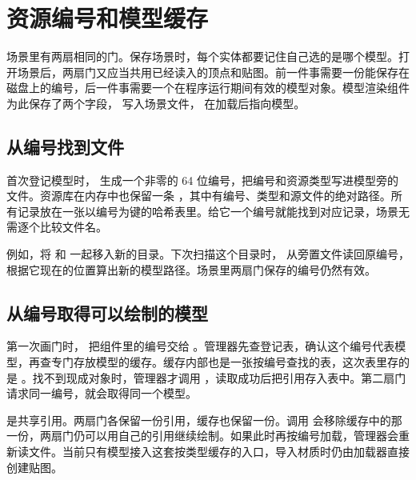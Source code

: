 \clearpage
\section{资源编号和模型缓存}\label{sec:data-assets}
场景里有两扇相同的门。保存场景时，每个实体都要记住自己选的是哪个模型。打开场景后，两扇门又应当共用已经读入的顶点和贴图。前一件事需要一份能保存在磁盘上的编号，后一件事需要一个在程序运行期间有效的模型对象。模型渲染组件  为此保存了两个字段， 写入场景文件， 在加载后指向模型。

\subsection{从编号找到文件}
首次登记模型时， 生成一个非零的 64 位编号，把编号和资源类型写进模型旁的  文件。资源库在内存中也保留一条 ，其中有编号、类型和源文件的绝对路径。所有记录放在一张以编号为键的哈希表里。给它一个编号就能找到对应记录，场景无需逐个比较文件名。

例如，将  和  一起移入新的目录。下次扫描这个目录时， 从旁置文件读回原编号，根据它现在的位置算出新的模型路径。场景里两扇门保存的编号仍然有效。

\subsection{从编号取得可以绘制的模型}
第一次画门时， 把组件里的编号交给 。管理器先查登记表，确认这个编号代表模型，再查专门存放模型的缓存。缓存内部也是一张按编号查找的表，这次表里存的是 。找不到现成对象时，管理器才调用 ，读取成功后把引用存入表中。第二扇门请求同一编号，就会取得同一个模型。


 是共享引用。两扇门各保留一份引用，缓存也保留一份。调用  会移除缓存中的那一份，两扇门仍可以用自己的引用继续绘制。如果此时再按编号加载，管理器会重新读文件。当前只有模型接入这套按类型缓存的入口，导入材质时仍由加载器直接创建贴图。


